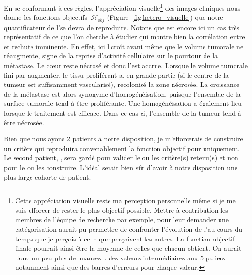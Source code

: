\documentclass[main.tex]{subfiles}
\begin{document}
En se conformant à ces règles, l'appréciation visuelle\footnote{\samepage Cette appréciation visuelle reste ma perception personnelle même si je me suis efforcer de rester le plus objectif possible. Mettre à contribution les membres de l'équipe de recherche par exemple, pour leur demander une catégorisation aurait pu permettre de confronter l'évolution de l'\hetero au cours du temps que je perçois à celle que perçoivent les autres. La fonction objectif finale pourrait ainsi être la moyenne de celles que chacun obtient. On aurait donc un peu plus de nuances~: des valeurs intermédiaires aux 5 paliers notamment ainsi que des barres d'erreurs pour chaque valeur.}
 des images cliniques nous donne les fonctions objectifs~$\mathscr{H}_{obj}$ (\cf Figure~\ref{fig:hetero_visuelle}) que notre quantificateur de l'\hetero se devra de reproduire. 
Notons que \Nber est encore ici un cas très représentatif de ce que l'on cherche à étudier \ie qui montre bien la corrélation entre \hetero et rechute imminente. En effet, ici l'\hetero croît avant même que le volume tumorale ne réaugmente, signe de la reprise d'activité cellulaire sur le pourtour de la métastase. Le c\oe{}ur reste nécrosé et donc l'\hetero est accrue. Lorsque le volume tumorale fini par augmenter, le tissu proliférant a, en grande partie (si le centre de la tumeur est suffisamment vascularisé), recolonisé la zone nécrosée. La croissance de la métastase est alors synonyme d'homogénéisation, puisque l'ensemble de la surface tumorale tend à être proliférante. Une homogénéisation a également lieu lorsque le traitement est efficace. Dans ce cas-ci, l'ensemble de la tumeur tend à être nécrosée.


Bien que nous ayons 2 patients à notre disposition, je m'efforcerais de construire un critère qui reproduira convenablement la fonction objectif pour \Nber uniquement. Le second patient, \Chen, sera gardé pour valider le ou les critère(s) retenu(s) et non pour le ou les construire. L'idéal serait bien sûr d'avoir à notre disposition une plus large cohorte de patient.
\end{document}

